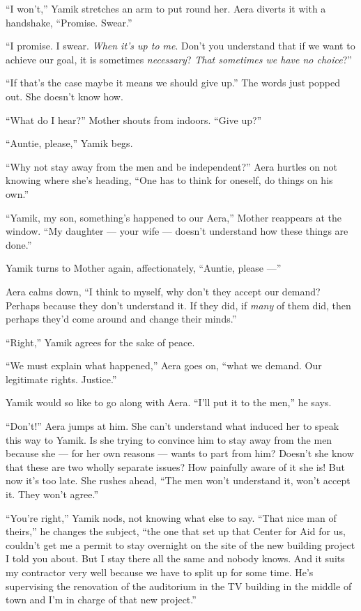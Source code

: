 \documentclass[twoside,11pt,openany]{book}
\begin{document}
``I won't,'' Yamik stretches an arm to put round her. Aera diverts it with a handshake,
``Promise. Swear.''

``I promise. I swear. \textit{When it's up to me}. Don't you understand that if we want to achieve our
goal, it is sometimes \textit{necessary}? \textit{That sometimes we have no choice}?''

``If that's the case maybe it means we should give up.'' The words just popped out. She
doesn't know how.

``What do I hear?'' Mother shouts from indoors. ``Give up?''

``Auntie, please,'' Yamik begs.

``Why not stay away from the men and be independent?'' Aera hurtles on not knowing where she's heading,
``One has to think for oneself, do things on his own.''

``Yamik, my son, something's happened to our Aera,'' Mother reappears at the window.
``My daughter --- your wife ---  doesn't understand how these things are done.''

Yamik turns to Mother again, affectionately, ``Auntie, please ---''

Aera calms down, ``I think to myself, why don't they accept our demand? Perhaps because they don't
understand it. If they did, if \textit{many} of them did, then perhaps they'd come around and change their
minds.''

``Right,'' Yamik agrees for the sake of peace.

``We must explain what happened,'' Aera goes on, ``what we demand. Our legitimate rights.
Justice.''

Yamik would so like to go along with Aera. ``I'll put it to the men,'' he says.

``Don't!'' Aera jumps at him. She can't understand what induced her to speak this way to
Yamik. Is she trying to convince him to stay away from the men because she --- for her own reasons --- wants to part from
him? Doesn't she know that these are two wholly separate issues? How painfully aware of it she is! But now it's too
late. She rushes ahead, ``The men won't understand it, won't accept it.  They won't agree.''

``You're right,'' Yamik nods, not knowing what else to say. ``That nice man of
theirs,'' he changes the subject, ``the one that set up that Center for Aid for us, couldn't get me a permit to stay
overnight on the site of the new building project I told you about. But I stay there all the same and nobody knows. And
it suits my contractor very well because we have to split up for some time. He's supervising the renovation of the
auditorium in the TV building in the middle of town and I'm in charge of that new project.''
\end{document}
